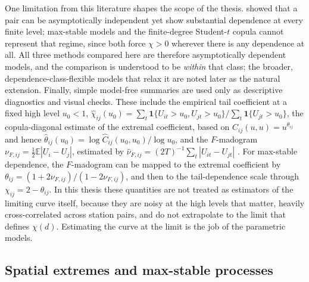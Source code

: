 One limitation from this literature shapes the scope of the thesis. \citet{ledford1996} showed that a pair can be asymptotically independent yet show substantial dependence at every finite level; max-stable models and the finite-degree Student-\(t\) copula cannot represent that regime, since both force \(\chi>0\) wherever there is any dependence at all. All three methods compared here are therefore asymptotically dependent models, and the comparison is understood to be \emph{within} that class; the broader, dependence-class-flexible models that relax it \citep{huserwadsworth2022} are noted later as the natural extension.
Finally, simple model-free summaries are used only as descriptive diagnostics and visual checks. These include the empirical tail coefficient at a fixed high level \(u_0<1\), \(\widehat\chi_{ij}(u_0)=\sum_t \mathbf 1\{U_{it}>u_0,U_{jt}>u_0\}/\sum_t \mathbf 1\{U_{jt}>u_0\}\), the copula-diagonal estimate of the extremal coefficient, based on \(C_{ij}(u,u)=u^{\theta_{ij}}\) and hence \(\widehat\theta_{ij}(u_0)=\log \widehat C_{ij}(u_0,u_0)/\log u_0\), and the \(F\)-madogram \(\nu_{F,ij}=\frac12\mathbb E|U_i-U_j|\), estimated by \(\widehat\nu_{F,ij}=(2T)^{-1}\sum_t |U_{it}-U_{jt}|\) \citep{cooley2006}. For max-stable dependence, the \(F\)-madogram can be mapped to the extremal coefficient by \(\theta_{ij}=(1+2\nu_{F,ij})/(1-2\nu_{F,ij})\), and then to the tail-dependence scale through \(\chi_{ij}=2-\theta_{ij}\). In this thesis these quantities are not treated as estimators of the limiting curve itself, because they are noisy at the high levels that matter, heavily cross-correlated across station pairs, and do not extrapolate to the limit that defines \(\chi(d)\). Estimating the curve at the limit is the job of the parametric models.


\subsection{Spatial extremes and max-stable processes}\label{sec:lit-maxstable}\label{sec:lit-br}\label{sec:lit-extt}

